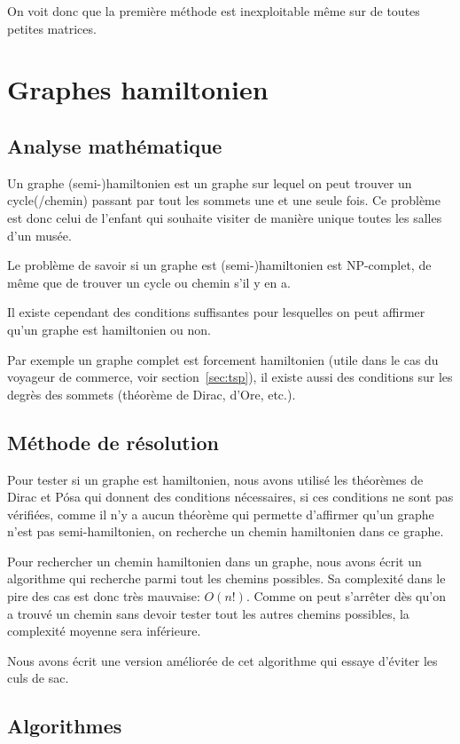 \documentclass{scrartcl}
\begin{document}
    On voit donc que la première méthode est inexploitable même sur de toutes
    petites matrices.

\section{Graphes hamiltonien}
  \subsection{Analyse mathématique}
    Un graphe (semi-)hamiltonien est un graphe sur lequel on peut
    trouver un cycle(/chemin) passant par tout les sommets une et une seule
    fois. Ce problème est donc celui de l'enfant qui souhaite visiter de
    manière unique toutes les salles d'un musée.

    Le problème de savoir si un graphe est (semi-)hamiltonien est NP-complet,
    de même que de trouver un cycle ou chemin s'il y en a.

    Il existe cependant des conditions suffisantes pour lesquelles on peut
    affirmer qu'un graphe est hamiltonien ou non.

    Par exemple un graphe complet est forcement hamiltonien (utile dans le cas
    du voyageur de commerce, voir section~\ref{sec:tsp}), il existe aussi des
    conditions sur les degrès des sommets (théorème de Dirac, d'Ore, etc.).

  \subsection{Méthode de résolution}
    Pour tester si un graphe est hamiltonien, nous avons utilisé les théorèmes
    de Dirac et Pósa qui donnent des conditions nécessaires, si ces conditions
    ne sont pas vérifiées, comme il n'y a aucun théorème qui permette
    d'affirmer qu'un graphe n'est pas semi-hamiltonien, on recherche un chemin
    hamiltonien dans ce graphe.

    Pour rechercher un chemin hamiltonien dans un graphe, nous avons écrit un
    algorithme qui recherche parmi tout les chemins possibles. Sa complexité
    dans le pire des cas est donc très mauvaise: $O(n!)$. Comme on peut
    s'arrêter dès qu'on a trouvé un chemin sans devoir tester tout les autres
    chemins possibles, la complexité moyenne sera inférieure.

    Nous avons écrit une version améliorée de cet algorithme qui essaye
    d'éviter les culs de sac.

  \subsection{Algorithmes}
\end{document}
